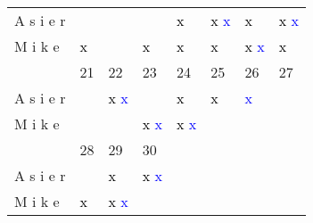 \documentclass{article}%
\begin{document}
\begin{longtabu}{| X[l] | X[c] | X[c] | X[c] | X[c] | X[c] | X[c] | X[c] |}
\hline%
A%
s%
i%
e%
r&\textcolor{black}{%
}%
\textcolor{blue}{%
}&\textcolor{black}{%
}%
\textcolor{blue}{%
}&\textcolor{black}{%
}%
\textcolor{blue}{%
}&\textcolor{black}{%
x%
}%
\textcolor{blue}{%
}&\textcolor{black}{%
x%
}%
\textcolor{blue}{%
x%
}&\textcolor{black}{%
x%
}%
\textcolor{blue}{%
}&\textcolor{black}{%
x%
}%
\textcolor{blue}{%
x%
}\\%
M%
i%
k%
e&\textcolor{black}{%
x%
}%
\textcolor{blue}{%
}&\textcolor{black}{%
}%
\textcolor{blue}{%
}&\textcolor{black}{%
x%
}%
\textcolor{blue}{%
}&\textcolor{black}{%
x%
}%
\textcolor{blue}{%
}&\textcolor{black}{%
x%
}%
\textcolor{blue}{%
}&\textcolor{black}{%
x%
}%
\textcolor{blue}{%
x%
}&\textcolor{black}{%
x%
}%
\textcolor{blue}{%
}\\%
\hline%
\hline%
&21&22&23&24&25&26&27\\%
\hline%
A%
s%
i%
e%
r&\textcolor{black}{%
}%
\textcolor{blue}{%
}&\textcolor{black}{%
x%
}%
\textcolor{blue}{%
x%
}&\textcolor{black}{%
}%
\textcolor{blue}{%
}&\textcolor{black}{%
x%
}%
\textcolor{blue}{%
}&\textcolor{black}{%
x%
}%
\textcolor{blue}{%
}&\textcolor{black}{%
}%
\textcolor{blue}{%
x%
}&\textcolor{black}{%
}%
\textcolor{blue}{%
}\\%
M%
i%
k%
e&\textcolor{black}{%
}%
\textcolor{blue}{%
}&\textcolor{black}{%
}%
\textcolor{blue}{%
}&\textcolor{black}{%
x%
}%
\textcolor{blue}{%
x%
}&\textcolor{black}{%
x%
}%
\textcolor{blue}{%
x%
}&\textcolor{black}{%
}%
\textcolor{blue}{%
}&\textcolor{black}{%
}%
\textcolor{blue}{%
}&\textcolor{black}{%
}%
\textcolor{blue}{%
}\\%
\hline%
\hline%
&28&29&30&&&&\\%
\hline%
A%
s%
i%
e%
r&\textcolor{black}{%
}%
\textcolor{blue}{%
}&\textcolor{black}{%
x%
}%
\textcolor{blue}{%
}&\textcolor{black}{%
x%
}%
\textcolor{blue}{%
x%
}&&&&\\%
M%
i%
k%
e&\textcolor{black}{%
x%
}%
\textcolor{blue}{%
}&\textcolor{black}{%
x%
}%
\textcolor{blue}{%
x%
}&\textcolor{black}{%
}%
\textcolor{blue}{%
}&&&&\\%
\hline%
\hline%
\end{longtabu}%
\vspace*{8ex}%
\pagestyle{firstpage}%
\end{document}
